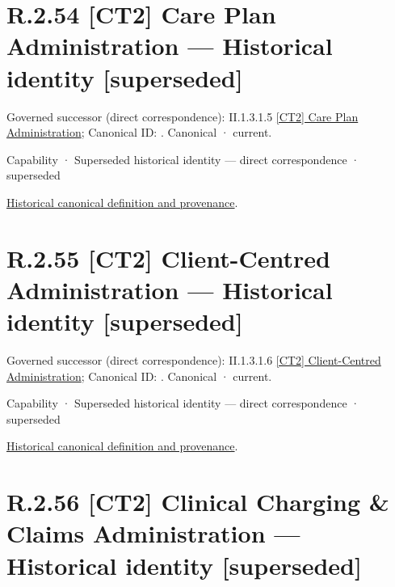 \section*{R.2.54 [CT2] Care Plan Administration — Historical identity [superseded]}
\label{navigation:R.2.54}

{\small Governed successor (direct correspondence): II.1.3.1.5 \hyperref[element:cf06eec5699f406fa30a00d2f76e3098]{[CT2] Care Plan Administration}; Canonical ID: \texttt{}. Canonical · current.}\par
\label{element:e31407cea7624632a8ed2dc53b09d726}
{\small Capability · Superseded historical identity — direct correspondence · superseded}\par
\href{../../../../continuum/strategy/capability/e31407cea7624632a8ed2dc53b09d726.md}{Historical canonical definition and provenance}.\par
\section*{R.2.55 [CT2] Client-Centred Administration — Historical identity [superseded]}
\label{navigation:R.2.55}

{\small Governed successor (direct correspondence): II.1.3.1.6 \hyperref[element:8752b7a937754b2faa296300c6a48911]{[CT2] Client-Centred Administration}; Canonical ID: \texttt{}. Canonical · current.}\par
\label{element:232b3fb2ff204c9b9ff7a60ff6a7a32d}
{\small Capability · Superseded historical identity — direct correspondence · superseded}\par
\href{../../../../continuum/strategy/capability/232b3fb2ff204c9b9ff7a60ff6a7a32d.md}{Historical canonical definition and provenance}.\par
\section*{R.2.56 [CT2] Clinical Charging \& Claims Administration — Historical identity [superseded]}
\label{navigation:R.2.56}


